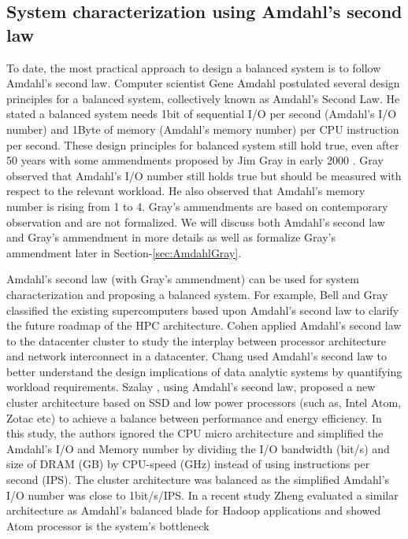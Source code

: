 \documentclass[journal]{IEEEtran}
\begin{document}
\subsection{System characterization using Amdahl's second law }
To date, the most practical approach to design a balanced system is to follow Amdahl's second law.  Computer scientist Gene Amdahl  postulated several design principles for a balanced system, collectively known as Amdahl's Second Law.  He stated a balanced system needs 1bit of sequential I/O per second (Amdahl's I/O number) and 1Byte of memory (Amdahl's memory number) per CPU instruction per second. These design principles for balanced system still hold true, even after 50 years with some ammendments proposed by Jim Gray in early 2000 \cite{Amdahl:RuleofThumbgray2000rules}. Gray observed that Amdahl's I/O number still holds true but should be measured with respect to the relevant workload. He also observed that  Amdahl's memory number is rising from 1 to 4. Gray's ammendments are based on contemporary observation and are not formalized. We will discuss both Amdahl's second law and Gray's ammendment in more details as well as formalize Gray's ammendment later in Section-\ref{sec:AmdahlGray}. 

Amdahl's second law (with Gray's ammendment) can be used for system characterization and proposing a balanced system. For example, Bell and Gray \cite{Amdahl:PetascaleBell2005petascale} classified the existing supercomputers based upon Amdahl's second law to clarify the future roadmap of the HPC architecture. Cohen \cite{Balance:cohen2009applying} applied Amdahl’s second law to the datacenter cluster to study the interplay between processor architecture and network interconnect in a datacenter. Chang  \cite{Amdahl:Workloadchang} used Amdahl's second law to better understand the design implications of data analytic systems by quantifying workload requirements. Szalay \cite{cluster:AmdahlBalancedBlade}, using Amdahl's second law, proposed a new cluster architecture  based on SSD and low power processors (such as, Intel Atom, Zotac etc) to achieve a balance between performance and energy efficiency. In this study, the authors ignored the CPU micro architecture and simplified the Amdahl's I/O and Memory number by dividing the I/O bandwidth (bit/s) and size of DRAM (GB) by CPU-speed (GHz) instead of using instructions per second (IPS). The cluster architecture was balanced as the simplified Amdahl's I/O number was close to 1bit/s/IPS. In a recent study \cite{Balance:zheng2014hadoop} Zheng evaluated a similar architecture as Amdahl's balanced blade for Hadoop applications and showed Atom processor is the system's bottleneck  %
\end{document}
